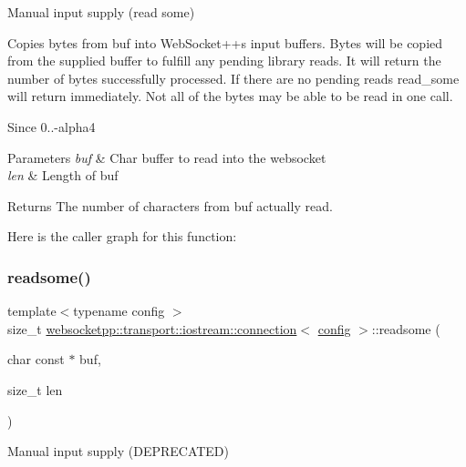 Manual input supply (read some) 

Copies bytes from buf into Web\+Socket++\textquotesingle{}s input buffers. Bytes will be copied from the supplied buffer to fulfill any pending library reads. It will return the number of bytes successfully processed. If there are no pending reads read\+\_\+some will return immediately. Not all of the bytes may be able to be read in one call.

\begin{DoxySince}{Since}
0..-\/alpha4
\end{DoxySince}

\begin{DoxyParams}{Parameters}
{\em buf} & Char buffer to read into the websocket \\
\hline
{\em len} & Length of buf \\
\hline
\end{DoxyParams}
\begin{DoxyReturn}{Returns}
The number of characters from buf actually read. 
\end{DoxyReturn}
Here is the caller graph for this function\+:
\mbox{\label{classwebsocketpp_1_1transport_1_1iostream_1_1connection_a72f532fb0a8d339371b8ca112fdd3f66}} 
\subsubsection{\texorpdfstring{readsome()}{readsome()}}
{\footnotesize\ttfamily template$<$typename config $>$ \\
size\+\_\+t \mbox{\hyperlink{classwebsocketpp_1_1transport_1_1iostream_1_1connection}{websocketpp\+::transport\+::iostream\+::connection}}$<$ \mbox{\hyperlink{classconfig}{config}} $>$\+::readsome (\begin{DoxyParamCaption}\item[{char const $\ast$}]{buf,  }\item[{size\+\_\+t}]{len }\end{DoxyParamCaption})\hspace{0.3cm}{\ttfamily [inline]}}



Manual input supply (D\+E\+P\+R\+E\+C\+A\+T\+ED) 


